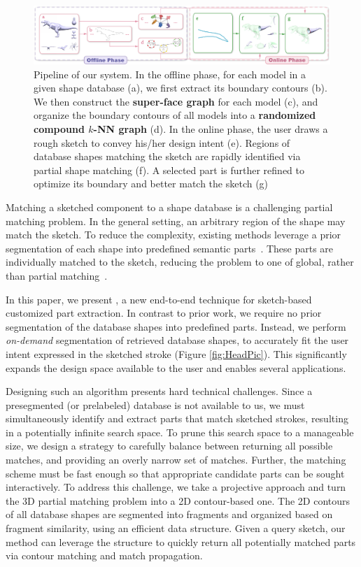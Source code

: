 \begin{figure}[t]
\centering
\includegraphics[width=\linewidth]{./Material/Pipeline.pdf}
\caption{Pipeline of our system. In the offline phase, for each model in a given shape database (a), we first extract its boundary contours (b). We then construct the \textbf{super-face graph} for each model (c), and organize the boundary contours of all models into a \textbf{randomized compound $k$-NN graph} (d). In the online phase, the user draws a rough sketch to convey his/her design intent (e). Regions of database shapes matching the sketch are rapidly identified via partial shape matching (f). A selected part is further refined to optimize its boundary and better match the sketch (g)}\label{fig:pipeline}
\end{figure}

Matching a sketched component to a shape database is a challenging partial matching problem. In the general setting, an arbitrary region of the shape may match the sketch. To reduce the complexity, existing methods leverage a prior segmentation of each shape into predefined semantic parts~\cite{sketchbasedcompositionfunkhousersbim2008,sketchtodesignxukaicgf2013}. These parts are individually matched to the sketch, reducing the problem to one of global, rather than partial matching~\cite{EitRicBouHilAle12}.

In this paper, we present {\ProjName}, a new end-to-end technique for sketch-based customized part extraction. In contrast to prior work, we require no prior segmentation of the database shapes into predefined parts. Instead, we perform {\em on-demand} segmentation of retrieved database shapes, to accurately fit the user intent expressed in the sketched stroke (Figure \ref{fig:HeadPic}). This significantly expands the design space available to the user and enables several applications.

Designing such an algorithm presents hard technical challenges. Since a presegmented (or prelabeled) database is not available to us, we must simultaneously identify and extract parts that match sketched strokes, resulting in a potentially infinite search space. To prune this search space to a manageable size, we design a strategy to carefully balance between returning all possible matches, and providing an overly narrow set of matches. Further, the matching scheme must be fast enough so that appropriate candidate parts can be sought interactively. To address this challenge, we take a projective approach and turn the 3D partial matching problem into a 2D contour-based one. The 2D contours of all database shapes are segmented into fragments and organized based on fragment similarity, using an efficient data structure. Given a query sketch, our method can leverage the structure to quickly return all potentially matched parts via contour matching and match propagation.

